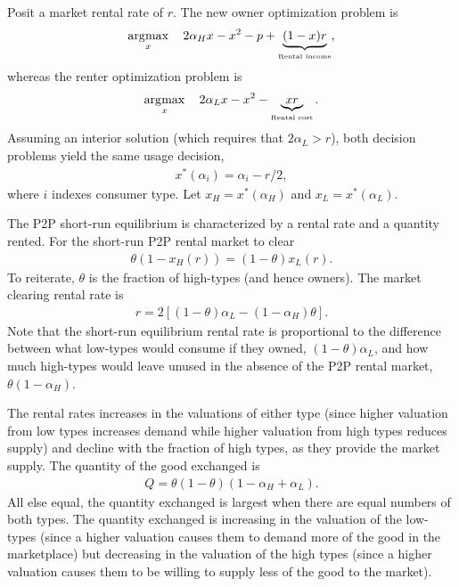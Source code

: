 \documentclass[11pt]{article}
\DeclareMathOperator*{\argmax}{\arg\!\max}
\begin{document}
Posit a market rental rate of $r$. 
The new owner optimization problem is 
\begin{align}
\argmax_x \quad 2\alpha_H x - x^2 -p + \underbrace{(1-x)r}_{\mbox{{\tiny Rental income}}},   \nonumber 
\end{align} 
whereas the renter optimization problem is 
\begin{align}
\argmax_x \quad 2 \alpha_L x - x^2 - \underbrace{xr}_{\mbox{{\tiny Rental cost}}}.  \nonumber
\end{align} 
Assuming an interior solution (which requires that $2\alpha_L > r$), both decision problems yield the same usage decision, 
\begin{align}
x^*(\alpha_i) = \alpha_i - r/2, 
\end{align} 
where $i$ indexes consumer type. 
Let $x_H = x^*(\alpha_H)$ and $x_L = x^*(\alpha_L)$. 

The P2P short-run equilibrium is characterized by a rental rate and a quantity rented. 
For the short-run P2P rental market to clear 
\begin{align}
  \theta \left( 1 - x_H(r) \right) = (1-\theta) x_L(r).
\end{align}
To reiterate, $\theta$ is the fraction of high-types (and hence owners).  
The market clearing rental rate is 
\begin{align} \label{eq:strr} 
r = 2\left[ (1-\theta)\alpha_L - (1-\alpha_H) \theta \right]. 
\end{align}
Note that the short-run equilibrium rental rate is proportional to the difference between what low-types would consume if they owned, $(1-\theta)\alpha_L$, and how much high-types would leave unused in the absence of the P2P rental market, $\theta (1-\alpha_H)$. 

The rental rates increases in the valuations of either type (since higher valuation from low types increases demand while higher valuation from high types reduces supply) and decline with the fraction of high types, as they provide the market supply. 
The quantity of the good exchanged is 
\begin{align} \label{eq:qty}
  Q = \theta (1-\theta) \left(1 - \alpha_H + \alpha_L\right).
\end{align} 
All else equal, the quantity exchanged is largest when there are equal numbers of both types.
The quantity exchanged is increasing in the valuation of the low-types (since a higher valuation causes them to demand more of the good in the marketplace) but decreasing in the valuation of the high types (since a higher valuation causes them to be willing to supply less of the good to the market). 
\end{document}
